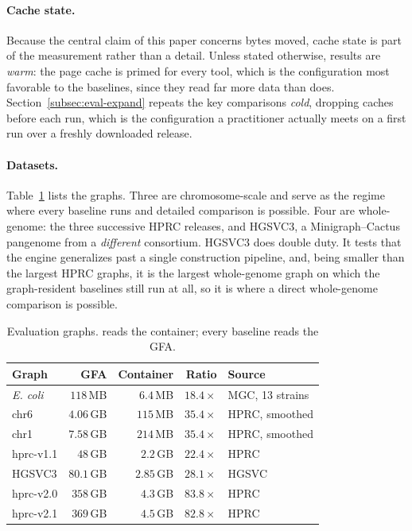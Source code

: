 \paragraph{Cache state.}
Because the central claim of this paper concerns bytes moved, cache state is part
of the measurement rather than a detail. Unless stated otherwise, results are
\emph{warm}: the page cache is primed for every tool, which is the configuration
most favorable to the baselines, since they read far more data than \sys does.
Section~\ref{subsec:eval-expand} repeats the key comparisons \emph{cold}, dropping
caches before each run, which is the configuration a practitioner actually meets
on a first run over a freshly downloaded release.

\paragraph{Datasets.}
Table~\ref{tab:datasets} lists the graphs. Three are chromosome-scale and serve
as the regime where every baseline runs and detailed comparison is possible. Four
are whole-genome: the three successive HPRC releases, and HGSVC3, a
Minigraph--Cactus pangenome from a \emph{different} consortium. HGSVC3 does double
duty. It tests that the engine generalizes past a single construction pipeline,
and, being smaller than the largest HPRC graphs, it is the largest whole-genome
graph on which the graph-resident baselines still run at all, so it is where a
direct whole-genome comparison is possible.

\begin{table}[t]
\centering
\small
\setlength{\tabcolsep}{4pt}
\caption{Evaluation graphs. \sys reads the container; every baseline reads the
GFA.}
\label{tab:datasets}
\begin{tabular}{@{}lrrrl@{}}
\toprule
Graph & GFA & Container & Ratio & Source \\
\midrule
\emph{E. coli}  & $118$\,MB & $6.4$\,MB & $18.4\times$ & MGC, 13 strains \\
chr6            & $4.06$\,GB & $115$\,MB & $35.4\times$ & HPRC, smoothed \\
chr1            & $7.58$\,GB & $214$\,MB & $35.4\times$ & HPRC, smoothed \\
hprc-v1.1       & $48$\,GB  & $2.2$\,GB & $22.4\times$ & HPRC \\
HGSVC3          & $80.1$\,GB & $2.85$\,GB & $28.1\times$ & HGSVC \\
hprc-v2.0       & $358$\,GB & $4.3$\,GB & $83.8\times$ & HPRC \\
hprc-v2.1       & $369$\,GB & $4.5$\,GB & $82.8\times$ & HPRC \\
\bottomrule
\end{tabular}
\end{table}

